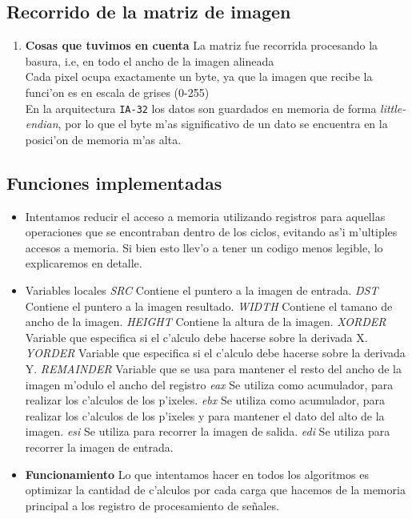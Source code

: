 \documentclass[11pt]{article}
\begin{document}
\newpage
\subsection{Recorrido de la matriz de imagen}
\begin{enumerate}
\item \textbf{Cosas que tuvimos en cuenta} 
\subitem La matriz fue recorrida procesando la basura, i.e, en todo el ancho de la imagen alineada \\
\subitem Cada pixel ocupa exactamente un byte, ya que la imagen que recibe la funci'on es en escala de grises (0-255)  \\
\subitem En la arquitectura \verb'IA-32' los datos son guardados en memoria de forma \emph{little-endian}, por lo que el byte m'as significativo de un dato se encuentra en la posici'on de memoria m'as alta.
\end{enumerate}

\subsection{Funciones implementadas}
\begin{itemize}
\item Intentamos reducir el acceso a memoria utilizando registros para aquellas operaciones que se encontraban dentro de los ciclos, evitando as'i m'ultiples accesos a memoria. Si bien esto llev'o a tener un codigo menos legible, lo explicaremos en detalle.
\item Variables locales
\subitem \textit{SRC} Contiene el puntero a la imagen de entrada.
\subitem \textit{DST} Contiene el puntero a la imagen resultado.
\subitem \textit{WIDTH} Contiene el tamano de ancho de la imagen.
\subitem \textit{HEIGHT} Contiene la altura de la imagen.
\subitem \textit{XORDER} Variable que especifica si el c'alculo debe hacerse sobre la derivada X.
\subitem \textit{YORDER} Variable que especifica si el c'alculo debe hacerse sobre la derivada Y.
\subitem \textit{REMAINDER} Variable que se usa para mantener el resto del ancho de la imagen m'odulo el ancho del registro 
\subitem \textit{eax} Se utiliza como acumulador, para realizar los c'alculos de los p'ixeles.
\subitem \textit{ebx} Se utiliza como acumulador, para realizar los c'alculos de los p'ixeles y para mantener el dato del alto de la imagen.
\subitem \textit{esi} Se utiliza para recorrer la imagen de salida.
\subitem \textit{edi} Se utiliza para recorrer la imagen de entrada.
\item \textbf{Funcionamiento}
\subitem Lo que intentamos hacer en todos los algoritmos es optimizar la cantidad de c'alculos por cada carga que hacemos de la memoria principal a los registro de procesamiento de se\~{n}ales.
\end{itemize}
\end{document}
